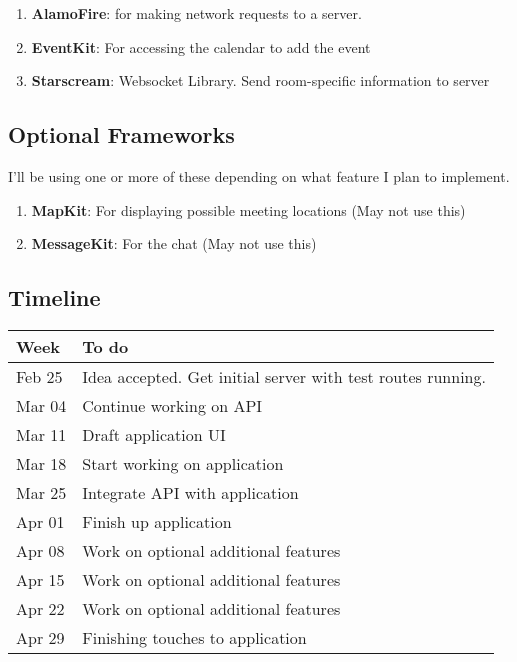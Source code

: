 \documentclass[11pt]{article}
\begin{document}
\begin{enumerate}
\item \textbf{AlamoFire}: for making network requests to a server.
\item \textbf{EventKit}: For accessing the calendar to add the event
\item \textbf{Starscream}: Websocket Library. Send room-specific information to server
\end{enumerate}

\subsection{Optional Frameworks}
\label{sec:orgd33fe7b}

I'll be using one or more of these depending on what feature I plan to implement. 

\begin{enumerate}
\item \textbf{MapKit}: For displaying possible meeting locations (May not use this)
\item \textbf{MessageKit}: For the chat (May not use this)
\end{enumerate}

\subsection{Timeline}
\label{sec:org54d56c8}

\begin{center}
\begin{tabular}{ll}
Week & To do\\
\hline
Feb 25 & Idea accepted. Get initial server with test routes running.\\
Mar 04 & Continue working on API\\
Mar 11 & Draft application UI\\
Mar 18 & Start working on application\\
Mar 25 & Integrate API with application\\
Apr 01 & Finish up application\\
Apr 08 & Work on optional additional features\\
Apr 15 & Work on optional additional features\\
Apr 22 & Work on optional additional features\\
Apr 29 & Finishing touches to application\\
\end{tabular}
\end{center}
\end{document}
